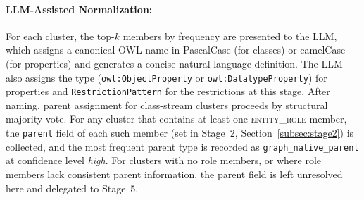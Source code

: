 \documentclass[sigconf]{acmart}
\begin{document}






\vspace{-0.5em}
\paragraph{\textbf{LLM-Assisted Normalization:}} For each cluster, the top-$k$ members by frequency are presented to the LLM, which assigns a canonical OWL name in PascalCase (for classes) or camelCase (for properties) and generates a concise natural-language definition. The LLM also assigns the type (\texttt{owl:ObjectProperty} or \texttt{owl:DatatypeProperty}) for properties and \texttt{RestrictionPattern} for the restrictions at this stage. After naming, parent assignment for class-stream clusters proceeds by structural majority vote. For any cluster that contains at least one \textsc{entity\_role} member, the \texttt{parent} field of each such member (set in Stage~2, Section~\ref{subsec:stage2}) is collected, and the most frequent parent type is recorded as \texttt{graph\_native\_parent} at confidence level \textit{high}. For clusters with no role members, or where role members lack consistent parent information, the parent field is left unresolved here and delegated to Stage~5.
\end{document}
